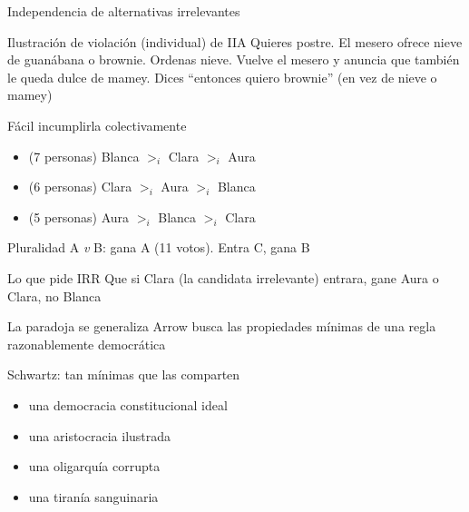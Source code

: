 \documentclass[bigger]{beamer}
\begin{document}
\begin{frame}[label={sec:orged19179}]{Independencia de alternativas irrelevantes}
\begin{block}{Ilustración de violación (individual) de IIA}
Quieres postre. El mesero ofrece nieve de guanábana o brownie. Ordenas nieve. Vuelve el mesero y anuncia que también le queda dulce de mamey. Dices ``entonces quiero brownie'' (en vez de nieve o mamey)
\pause
\end{block}
\begin{block}{Fácil incumplirla colectivamente}
\begin{itemize}
\item (7 personas) Blanca \(>_i\) Clara  \(>_i\) Aura
\item (6 personas) Clara  \(>_i\) Aura   \(>_i\) Blanca
\item (5 personas) Aura   \(>_i\) Blanca \(>_i\) Clara
\end{itemize}
Pluralidad A \emph{v} B: gana A (11 votos). Entra C, gana B
\pause
\end{block}
\begin{exampleblock}{Lo que pide IRR}
Que si Clara (la candidata irrelevante) entrara, gane Aura o Clara, no Blanca
\end{exampleblock}
\end{frame}

\begin{frame}[label={sec:orgec10fdf}]{La paradoja se generaliza}
Arrow busca las propiedades mínimas de una regla razonablemente democrática
\bigskip
\begin{block}{Schwartz: tan mínimas que las comparten}
\begin{itemize}
\item una democracia constitucional ideal
\item una aristocracia ilustrada
\item una oligarquía corrupta
\item una tiranía sanguinaria
\end{itemize}
\end{block}
\end{frame}
\end{document}
